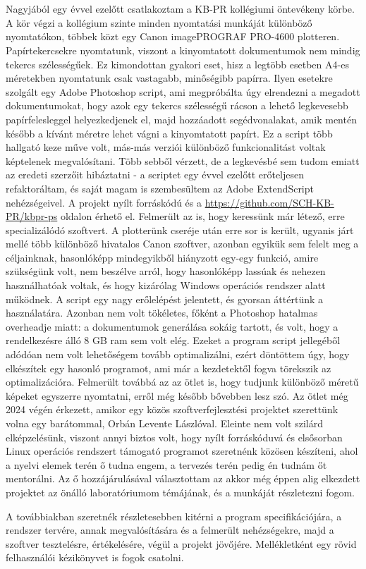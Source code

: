 \chapter{\bevezetes}

Nagyjából egy évvel ezelőtt csatlakoztam a KB-PR kollégiumi öntevékeny körbe. A kör végzi a kollégium szinte minden nyomtatási munkáját különböző nyomtatókon, többek közt egy Canon imagePROGRAF PRO-4600 plotteren. Papírtekercsekre nyomtatunk, viszont a kinyomtatott dokumentumok nem mindig tekercs szélességűek. Ez kimondottan gyakori eset, hisz a legtöbb esetben A4-es méretekben nyomtatunk csak vastagabb, minőségibb papírra. Ilyen esetekre szolgált egy Adobe Photoshop script, ami megpróbálta úgy elrendezni a megadott dokumentumokat, hogy azok egy tekercs szélességű rácson a lehető legkevesebb papírfelesleggel helyezkedjenek el, majd hozzáadott segédvonalakat, amik mentén később a kívánt méretre lehet vágni a kinyomtatott papírt.
Ez a script több hallgató keze műve volt, más-más verziói különböző funkcionalitást voltak képtelenek megvalósítani. Több sebből vérzett, de a legkevésbé sem tudom emiatt az eredeti szerzőit hibáztatni - a scriptet egy évvel ezelőtt erőteljesen refaktoráltam, és saját magam is szembesültem az Adobe ExtendScript nehézségeivel. A projekt nyílt forráskódú és a \href{https://github.com/SCH-KB-PR/kbpr-ps}{https://github.com/SCH-KB-PR/kbpr-ps} oldalon érhető el.
Felmerült az is, hogy keressünk már létező, erre specializálódó szoftvert. A plotterünk cseréje után erre sor is került, ugyanis járt mellé több különböző hivatalos Canon szoftver, azonban egyikük sem felelt meg a céljainknak, hasonlóképp mindegyikből hiányzott egy-egy funkció, amire szükségünk volt, nem beszélve arról, hogy hasonlóképp lassúak és nehezen használhatóak voltak, és hogy kizárólag Windows operációs rendszer alatt működnek.
A script egy nagy erőlelépést jelentett, és gyorsan áttértünk a használatára. Azonban nem volt tökéletes, főként a Photoshop hatalmas overheadje miatt: a dokumentumok generálása sokáig tartott, és volt, hogy a rendelkezésre álló 8 GB ram sem volt elég. Ezeket a program script jellegéből adódóan nem volt lehetőségem tovább optimalizálni, ezért döntöttem úgy, hogy elkészítek egy hasonló programot, ami már a kezdetektől fogva törekszik az optimalizációra. Felmerült továbbá az az ötlet is, hogy tudjunk különböző méretű képeket egyszerre nyomtatni, erről még később bővebben lesz szó.
Az ötlet még 2024 végén érkezett, amikor egy közös szoftverfejlesztési projektet szerettünk volna egy barátommal, Orbán Levente Lászlóval. Eleinte nem volt szilárd elképzelésünk, viszont annyi biztos volt, hogy nyílt forráskóduvá és elsősorban Linux operációs rendszert támogató programot szeretnénk közösen készíteni, ahol a nyelvi elemek terén ő tudna engem, a tervezés terén pedig én tudnám őt mentorálni. Az ő hozzájárulásával választottam az akkor még éppen alig elkezdett projektet az önálló laboratóriumom témájának, és a munkáját részletezni fogom.

A továbbiakban szeretnék részletesebben kitérni a program specifikációjára, a rendszer tervére, annak megvalósítására és a felmerült nehézségekre, majd a szoftver tesztelésre, értékelésére, végül a projekt jövőjére. Mellékletként egy rövid felhasználói kézikönyvet is fogok csatolni.